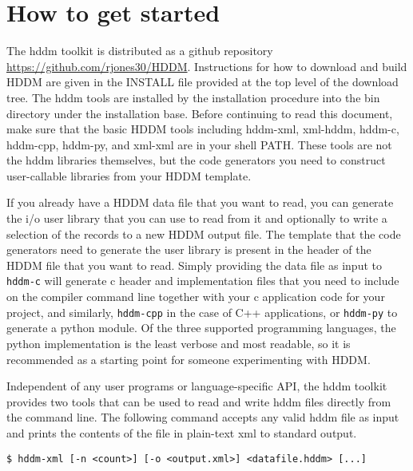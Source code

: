 \documentclass{revtex4}
\begin{document}
\section{How to get started}

The hddm toolkit is distributed as a github repository \url{https://github.com/rjones30/HDDM}.
Instructions for how to download and build HDDM are given in the INSTALL file
provided at the top level of the download tree. The hddm tools are installed
by the installation procedure into the bin directory under the installation
base. Before continuing to read this document, make sure that the basic HDDM tools
including hddm-{}xml, xml-{}hddm, hddm-{}c, hddm-{}cpp, hddm-{}py, and xml-{}xml
are in your shell PATH. These tools are not the hddm libraries themselves, but
the code generators you need to construct user-callable libraries from your 
HDDM template.

If you already have a HDDM data file that you want to read, you can generate
the i/o user library that you can use to read from it and optionally to write
a selection of the records to a new HDDM output file. The template that the
code generators need to generate the user library is present in the header of
the HDDM file that you want to read. Simply providing the data file as input
to \texttt{hddm-c} will generate c header and implementation files that you
need to include on the compiler command line together with your c application
code for your project, and similarly, \texttt{hddm-cpp} in the case of C++
applications, or \texttt{hddm-py} to generate a python module. Of the three
supported programming languages, the python implementation is the least
verbose and most readable, so it is recommended as a starting point for
someone experimenting with HDDM.

Independent of any user programs or language-{}specific API, the hddm toolkit
provides two tools that can be used to read and write hddm files directly from
the command line. The following command accepts any valid hddm file as input
and prints the contents of the file in plain-{}text xml to standard output.

\vspace{1cm}
\begin{minipage}{1cm}
\begin{verbatim}
$ hddm-xml [-n <count>] [-o <output.xml>] <datafile.hddm> [...]
\end{verbatim}
\end{minipage}
\vspace{1cm}
\end{document}
